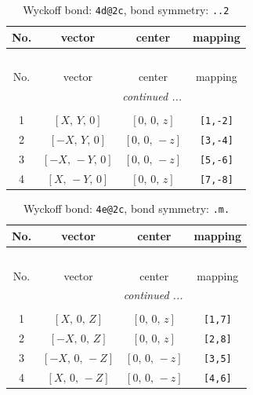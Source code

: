 \documentclass[fleqn,8pt]{jsarticle}
\begin{document}
\begin{longtable}{cccc}
\caption{Wyckoff bond: {\tt 4d@2c}, bond symmetry: {\tt ..2}}
 \\
 \hline \hline
No. & vector & center & mapping \\ \hline \endfirsthead

\multicolumn{3}{l}{\tablename\ \thetable{}} \\
 \hline \hline
No. & vector & center & mapping \\ \hline \endhead

 \hline \hline
\multicolumn{3}{r}{\footnotesize\it continued ...} \\ \endfoot

 \hline \hline
\multicolumn{3}{r}{} \\ \endlastfoot

1 & $\left[ X,\, Y,\, 0 \right]$ & $\left[ 0,\, 0,\, z \right]$ & {\tt [1,-2]} \\ \hline
2 & $\left[ - X,\, Y,\, 0 \right]$ & $\left[ 0,\, 0,\, - z \right]$ & {\tt [3,-4]} \\ \hline
3 & $\left[ - X,\, - Y,\, 0 \right]$ & $\left[ 0,\, 0,\, - z \right]$ & {\tt [5,-6]} \\ \hline
4 & $\left[ X,\, - Y,\, 0 \right]$ & $\left[ 0,\, 0,\, z \right]$ & {\tt [7,-8]} \\
\end{longtable}
\renewcommand{\arraystretch}{1.2}
\begin{longtable}{cccc}
\caption{Wyckoff bond: {\tt 4e@2c}, bond symmetry: {\tt .m.}}
 \\
 \hline \hline
No. & vector & center & mapping \\ \hline \endfirsthead

\multicolumn{3}{l}{\tablename\ \thetable{}} \\
 \hline \hline
No. & vector & center & mapping \\ \hline \endhead

 \hline \hline
\multicolumn{3}{r}{\footnotesize\it continued ...} \\ \endfoot

 \hline \hline
\multicolumn{3}{r}{} \\ \endlastfoot

1 & $\left[ X,\, 0,\, Z \right]$ & $\left[ 0,\, 0,\, z \right]$ & {\tt [1,7]} \\ \hline
2 & $\left[ - X,\, 0,\, Z \right]$ & $\left[ 0,\, 0,\, z \right]$ & {\tt [2,8]} \\ \hline
3 & $\left[ - X,\, 0,\, - Z \right]$ & $\left[ 0,\, 0,\, - z \right]$ & {\tt [3,5]} \\ \hline
4 & $\left[ X,\, 0,\, - Z \right]$ & $\left[ 0,\, 0,\, - z \right]$ & {\tt [4,6]} \\
\end{longtable}
\end{document}
